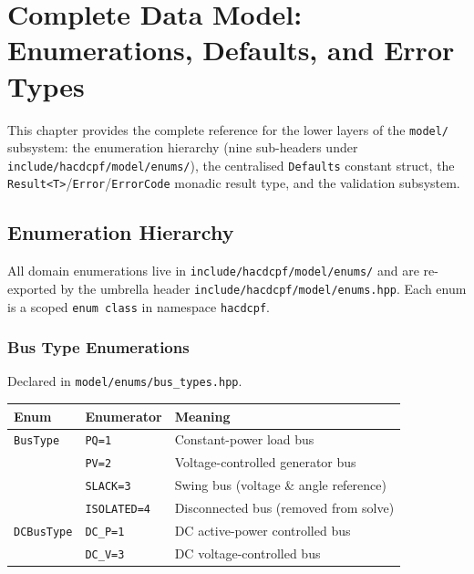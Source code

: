 \section{Complete Data Model: Enumerations, Defaults, and Error Types}
\label{sec:data-model-deep}

This chapter provides the complete reference for the lower layers of the
\texttt{model/} subsystem: the enumeration hierarchy (nine sub-headers under
\texttt{include/hacdcpf/model/enums/}), the centralised \texttt{Defaults}
constant struct, the \texttt{Result<T>}/\texttt{Error}/\texttt{ErrorCode}
monadic result type, and the validation subsystem.

\subsection{Enumeration Hierarchy}
\label{sec:enums}

All domain enumerations live in \texttt{include/hacdcpf/model/enums/} and are
re-exported by the umbrella header \texttt{include/hacdcpf/model/enums.hpp}.
Each enum is a scoped \texttt{enum class} in namespace \texttt{hacdcpf}.

\subsubsection{Bus Type Enumerations}
\label{sec:bus-enums}

Declared in \texttt{model/enums/bus\_types.hpp}.

\begin{center}
\begin{tabular}{lll}
\hline\hline
\textbf{Enum} & \textbf{Enumerator} & \textbf{Meaning} \\
\hline
\texttt{BusType} & \texttt{PQ=1} & Constant-power load bus \\
 & \texttt{PV=2} & Voltage-controlled generator bus \\
 & \texttt{SLACK=3} & Swing bus (voltage \& angle reference) \\
 & \texttt{ISOLATED=4} & Disconnected bus (removed from solve) \\
\hline
\texttt{DCBusType} & \texttt{DC\_P=1} & DC active-power controlled bus \\
 & \texttt{DC\_V=3} & DC voltage-controlled bus \\
\hline\hline
\end{tabular}
\end{center}

